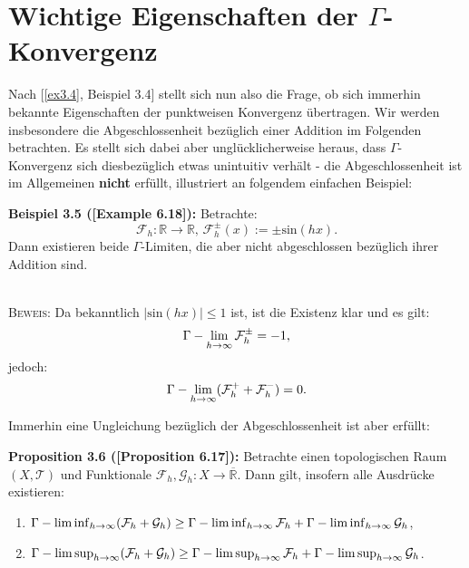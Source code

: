 \section[Wichtige Eigenschaften der Gamma-Konvergenz]{Wichtige Eigenschaften der \(\Gamma\)-Konvergenz}{\label{sec:gammaprop}}
Nach [\ref{ex3.4}, Beispiel 3.4] stellt sich nun also die Frage, ob sich immerhin bekannte Eigenschaften der punktweisen Konvergenz übertragen. Wir werden insbesondere die Abgeschlossenheit bezüglich einer Addition im Folgenden betrachten. Es stellt sich dabei aber unglücklicherweise heraus, dass \(\Gamma\)-Konvergenz sich diesbezüglich etwas unintuitiv verhält - die Abgeschlossenheit ist im Allgemeinen \textbf{nicht} erfüllt, illustriert an folgendem einfachen Beispiel:\\[0.5cm]
\colorbox{generalYellow}{\begin{minipage}{16cm}{\textcolor{black}{}{\label{ex3.5}}}
\textbf{Beispiel 3.5 (\cite{MasoGamma}[Example 6.18]):} Betrachte:
\begin{equation}
    \mathcal{F}_h : \mathbb{R} \to \mathbb{R}, \, \mathcal{F}_h^{\pm}(x) := \pm \text{sin}(hx).
\end{equation}
Dann existieren beide \(\Gamma\)-Limiten, die aber nicht abgeschlossen bezüglich ihrer Addition sind.
\end{minipage}}\\

\textsc{Beweis:} Da bekanntlich \(|\text{sin}(hx)| \leq 1\) ist, ist die Existenz klar und es gilt:
\begin{equation}
    \Gamma - \lim_{h \to \infty} \mathcal{F}_h^{\pm} = -1,
\end{equation}
jedoch:
\begin{equation}
    \Gamma - \lim_{h \to \infty} (\mathcal{F}_h^+ + \mathcal{F}_h^-) = 0.
\end{equation}
\QEDB

Immerhin eine Ungleichung bezüglich der Abgeschlossenheit ist aber erfüllt:\\[0.5cm]
\colorbox{generalYellow}{\begin{minipage}{16cm}{\textcolor{black}{}{\label{prop3.6}}}
\textbf{Proposition 3.6 (\cite{MasoGamma}[Proposition 6.17]):} Betrachte einen topologischen Raum \((X,\mathcal{T})\) und Funktionale \(\mathcal{F}_h, \mathcal{G}_h : X \to \overline{\mathbb{R}}\). Dann gilt, insofern alle Ausdrücke existieren:
\begin{enumerate}
    \item \(\Gamma - \liminf_{h \to \infty} (\mathcal{F}_h + \mathcal{G}_h) \geq \Gamma - \liminf_{h \to \infty} \mathcal{F}_h + \Gamma - \liminf_{h \to \infty} \mathcal{G}_h\),
    \item \(\Gamma - \limsup_{h \to \infty} (\mathcal{F}_h + \mathcal{G}_h) \geq \Gamma - \limsup_{h \to \infty} \mathcal{F}_h + \Gamma - \limsup_{h \to \infty} \mathcal{G}_h\).
\end{enumerate}
\end{minipage}}

